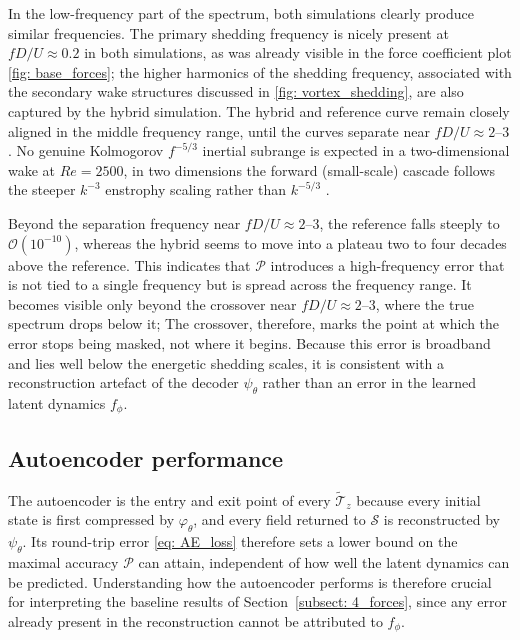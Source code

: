 In the low-frequency part of the spectrum, both simulations clearly produce similar frequencies. The primary shedding frequency is nicely present at  $fD/U \approx 0.2$ in both simulations, as was already visible in the force coefficient plot \ref{fig: base_forces}; the higher harmonics of the shedding frequency, associated with the secondary wake structures discussed in \ref{fig: vortex_shedding}, are also captured by the hybrid simulation. The hybrid and reference curve remain closely aligned in the middle frequency range, until the curves separate near $fD/U \approx 2$--$3$. No genuine Kolmogorov $f^{-5/3}$ inertial subrange is expected in a two-dimensional wake at $Re=2500$, in two dimensions the forward (small-scale) cascade follows the steeper $k^{-3}$ enstrophy scaling rather than $k^{-5/3}$ \cite{Boffetta2011}. 

Beyond the separation frequency near $fD/U \approx 2$--$3$, the reference falls steeply to $\mathcal{O}(10^{-10})$, whereas the hybrid seems to move into a plateau two to four decades above the reference. This indicates that $\mathcal{P}$ introduces a high-frequency error that is not tied to a single frequency but is spread across the frequency range. It becomes visible only beyond the crossover near $fD/U \approx 2$--$3$, where the true spectrum drops below it;
The crossover, therefore, marks the point at which the error stops being masked, not where it begins. Because this error is broadband and lies well below the energetic shedding scales, it is consistent with a reconstruction artefact of the decoder $\psi_\theta$ rather than an error in the learned latent dynamics $f_\phi$.

\subsection{Autoencoder performance}
\label{subsect: 4_ae_performance}

The autoencoder is the entry and exit point of every $\tilde{\boldsymbol{\mathcal{T}}}_z$ because every initial state is first compressed by $\varphi_\theta$, and every field returned to $\mathcal{S}$ is reconstructed by $\psi_\theta$. Its round-trip error \ref{eq: AE_loss} therefore sets a lower bound on the maximal accuracy $\mathcal{P}$ can attain, independent of how well the latent dynamics can be predicted. Understanding how the autoencoder performs is therefore crucial for interpreting the baseline results of Section~\ref{subsect: 4_forces}, since any error already present in the reconstruction cannot be attributed to $f_\phi$. 

